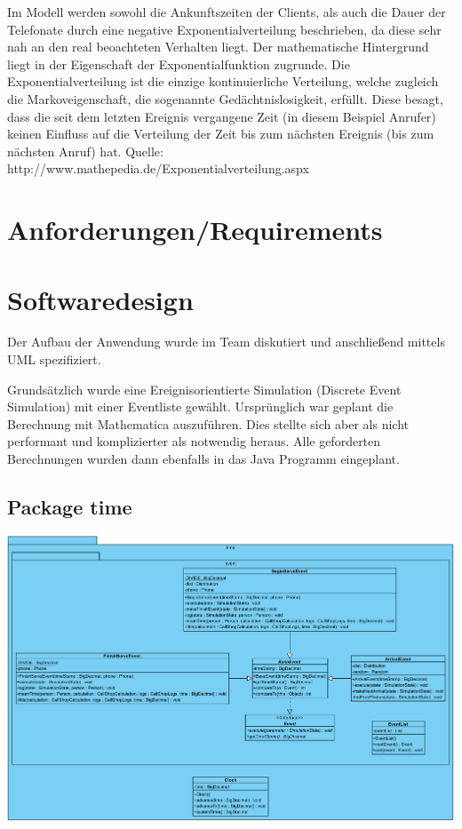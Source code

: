 Im Modell werden sowohl die Ankunftszeiten der Clients, als auch die Dauer der Telefonate durch eine negative Exponentialverteilung beschrieben, da diese sehr nah an den real beoachteten Verhalten liegt. Der mathematische Hintergrund liegt in der Eigenschaft der Exponentialfunktion zugrunde. Die Exponentialverteilung ist die einzige kontinuierliche Verteilung, welche zugleich die Markoveigenschaft, die sogenannte Gedächtnislosigkeit, erfüllt. Diese besagt, dass die seit dem letzten Ereignis vergangene Zeit (in diesem Beispiel Anrufer) keinen Einfluss auf die Verteilung der Zeit bis zum nächsten Ereignis (bis zum nächsten Anruf) hat. 
Quelle: http://www.mathepedia.de/Exponentialverteilung.aspx


\section{Anforderungen/Requirements}

\section{Softwaredesign}

Der Aufbau der Anwendung wurde im Team diskutiert und anschließend mittels UML spezifiziert.

Grundsätzlich wurde eine Ereignisorientierte Simulation (Discrete Event Simulation) mit einer Eventliste gewählt. Ursprünglich war geplant die Berechnung mit Mathematica auszuführen. Dies stellte sich aber als nicht performant und komplizierter als notwendig heraus. Alle geforderten Berechnungen wurden dann ebenfalls in das Java Programm eingeplant.

\subsection{Package time}

\includegraphics[scale=0.3]{abbildungen/uml/time.pdf}


